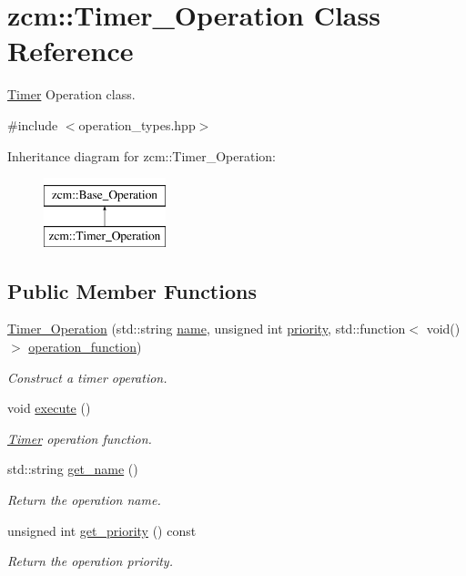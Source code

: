 \hypertarget{classzcm_1_1Timer__Operation}{\section{zcm\-:\-:Timer\-\_\-\-Operation Class Reference}
\label{classzcm_1_1Timer__Operation}
}


\hyperlink{classzcm_1_1Timer}{Timer} Operation class.  




{\ttfamily \#include $<$operation\-\_\-types.\-hpp$>$}

Inheritance diagram for zcm\-:\-:Timer\-\_\-\-Operation\-:\begin{figure}[H]
\begin{center}
\leavevmode
\includegraphics[height=2.000000cm]{classzcm_1_1Timer__Operation}
\end{center}
\end{figure}
\subsection*{Public Member Functions}
\begin{DoxyCompactItemize}
\item 
\hyperlink{classzcm_1_1Timer__Operation_aa578839e1aaf755f92170f20865a5740}{Timer\-\_\-\-Operation} (std\-::string \hyperlink{classzcm_1_1Base__Operation_a2e2192550818d8f063fc7b2c76c5e21c}{name}, unsigned int \hyperlink{classzcm_1_1Base__Operation_a38af3bcc2578ef215772d595bf3fa358}{priority}, std\-::function$<$ void()$>$ \hyperlink{classzcm_1_1Timer__Operation_a492e0ec6be1dfa846bbc83d9e5dea9b0}{operation\-\_\-function})
\begin{DoxyCompactList}\small\item\em Construct a timer operation. \end{DoxyCompactList}\item 
void \hyperlink{classzcm_1_1Timer__Operation_a3693312c4d4d106d0894bb35094efda7}{execute} ()
\begin{DoxyCompactList}\small\item\em \hyperlink{classzcm_1_1Timer}{Timer} operation function. \end{DoxyCompactList}\item 
std\-::string \hyperlink{classzcm_1_1Base__Operation_a46b6a3f23e18bc35425ec2dab80c849f}{get\-\_\-name} ()
\begin{DoxyCompactList}\small\item\em Return the operation name. \end{DoxyCompactList}\item 
unsigned int \hyperlink{classzcm_1_1Base__Operation_a3b15b35c31ed173d2abb193e9fba32ef}{get\-\_\-priority} () const 
\begin{DoxyCompactList}\small\item\em Return the operation priority. \end{DoxyCompactList}\end{DoxyCompactItemize}
